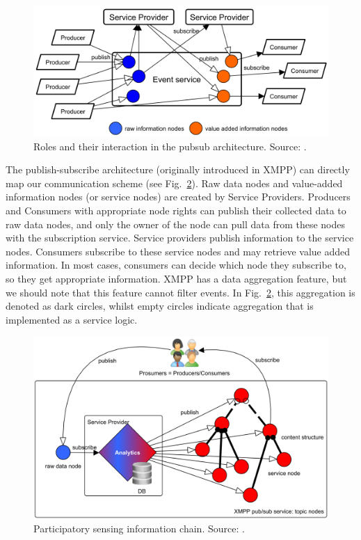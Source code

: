 \documentclass[b5paper,12pt]{report}
\theoremstyle{definition}
\begin{document}
\begin{figure}[ht!]
\centerline{
\includegraphics[width=12.6cm]{img/framework_roles.png}}
\caption{Roles and their interaction in the pubsub architecture. Source: \cite{szabo2013framework}.}
\label{framework_roles}
\end{figure}

The publish-subscribe architecture (originally introduced in XMPP) can directly map our communication scheme (see Fig.~\ref{framework_scheme}). Raw data nodes and value-added information nodes (or service nodes) are created by Service Providers. Producers and Consumers with appropriate node rights can publish their collected data to raw data nodes, and only the owner of the node can pull data from these nodes with the subscription service. Service providers publish information to the service nodes. Consumers subscribe to these service nodes and may retrieve value added information. In most cases, consumers can decide which node they subscribe to, so they get appropriate information. XMPP has a data aggregation feature, but we should note that this feature cannot filter events. In Fig.~\ref{framework_scheme}, this aggregation is denoted as dark circles, whilst empty circles indicate aggregation that is implemented as a service logic.

\begin{figure}[ht!]
\centerline{
\includegraphics[width=12.6cm]{img/framework_scheme.png}}
\caption{Participatory sensing information chain. Source: \cite{szabo2013framework}.}
\label{framework_scheme}
\end{figure}
\end{document}
